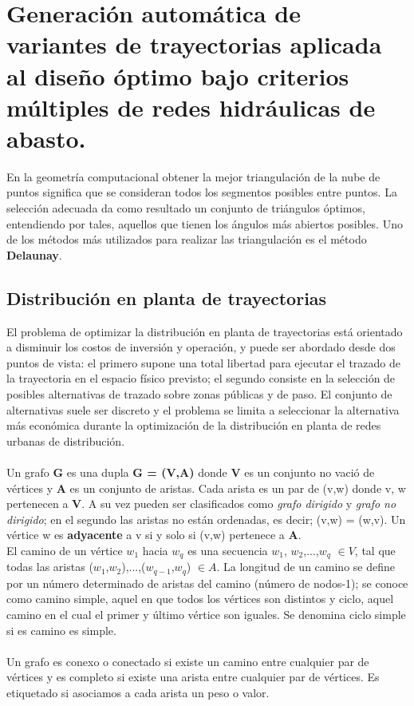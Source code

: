 \section*{Generación automática de variantes de trayectorias aplicada al diseño óptimo bajo criterios múltiples de redes hidráulicas de abasto.}
\noindent En la geometría computacional obtener la mejor triangulación de la nube de puntos significa que se consideran todos los segmentos posibles entre puntos. La selección adecuada da como resultado un conjunto de triángulos óptimos, entendiendo por tales, aquellos que tienen los ángulos más abiertos posibles. Uno de los métodos más utilizados para realizar las triangulación es el método \textbf{Delaunay}.

\subsection*{Distribución en planta de trayectorias}
\noindent El problema de optimizar la distribución en planta de trayectorias está orientado a disminuir los costos de inversión y operación, y puede ser abordado desde dos puntos de vista: el primero supone una total libertad para ejecutar el trazado de la trayectoria en el espacio físico previsto; el segundo consiste en la selección de posibles alternativas de trazado sobre zonas públicas y de paso. El conjunto de alternativas suele ser discreto y el problema se limita a seleccionar la alternativa más económica durante la optimización de la distribución en planta de redes urbanas de distribución.\\ \\
\noindent Un grafo \textbf{G} es una dupla \textbf{G = (V,A)} donde \textbf{V} es un conjunto no vació de vértices y \textbf{A} es un conjunto de aristas. Cada arista es un par de (v,w) donde v, w pertenecen a \textbf{V}. A su vez pueden ser clasificados como \textit{grafo dirigido} y \textit{grafo no dirigido}; en el segundo las aristas no están ordenadas, es decir; (v,w) = (w,v). Un vértice w es \textbf{adyacente} a v si y solo si (v,w) pertenece a \textbf{A}.\\
El camino de un vértice $w_{1}$ hacia $w_{q}$ es una secuencia $w_{1}$, $w_{2}$,...,$w_{q}$ $\in V$, tal que todas las aristas ($w_1$,$w_2$),...,($w_{q-1}$,$w_q$) $\in A$. La longitud de un camino se define por un número determinado de aristas del camino (número de nodos-1); se conoce como camino simple, aquel en que todos los vértices son distintos y ciclo, aquel camino en el cual el primer y último vértice son iguales. Se denomina ciclo simple si es camino es simple.\\ \\
\noindent Un grafo es conexo o conectado si existe un camino entre cualquier par de vértices y es completo si existe una arista entre cualquier par de vértices. Es etiquetado si asociamos a cada arista un peso o valor.

